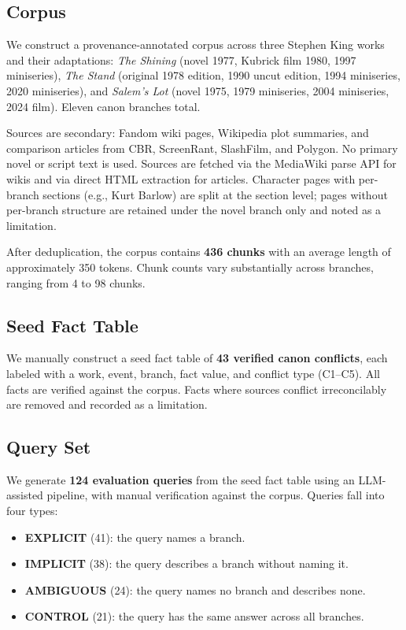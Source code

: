 \documentclass[conference]{IEEEtran}
\begin{document}
\subsection{Corpus}

We construct a provenance-annotated corpus across three Stephen King works and their adaptations: \textit{The Shining} (novel 1977, Kubrick film 1980, 1997 miniseries), \textit{The Stand} (original 1978 edition, 1990 uncut edition, 1994 miniseries, 2020 miniseries), and \textit{Salem's Lot} (novel 1975, 1979 miniseries, 2004 miniseries, 2024 film). Eleven canon branches total.

Sources are secondary: Fandom wiki pages, Wikipedia plot summaries, and comparison articles from CBR, ScreenRant, SlashFilm, and Polygon. No primary novel or script text is used. Sources are fetched via the MediaWiki parse API for wikis and via direct HTML extraction for articles. Character pages with per-branch sections (e.g., Kurt Barlow) are split at the section level; pages without per-branch structure are retained under the novel branch only and noted as a limitation.

After deduplication, the corpus contains \textbf{436 chunks} with an average length of approximately 350 tokens. Chunk counts vary substantially across branches, ranging from 4 to 98 chunks.

\subsection{Seed Fact Table}

We manually construct a seed fact table of \textbf{43 verified canon conflicts}, each labeled with a work, event, branch, fact value, and conflict type (C1--C5). All facts are verified against the corpus. Facts where sources conflict irreconcilably are removed and recorded as a limitation.

\subsection{Query Set}

We generate \textbf{124 evaluation queries} from the seed fact table using an LLM-assisted pipeline, with manual verification against the corpus. Queries fall into four types:
\begin{itemize}
\item \textbf{EXPLICIT} (41): the query names a branch.
\item \textbf{IMPLICIT} (38): the query describes a branch without naming it.
\item \textbf{AMBIGUOUS} (24): the query names no branch and describes none.
\item \textbf{CONTROL} (21): the query has the same answer across all branches.
\end{itemize}
\end{document}
